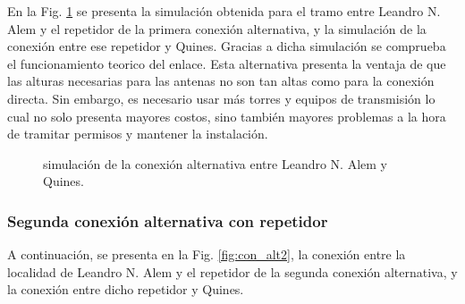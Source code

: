 \documentclass[11pt,a4paper]{article}
\begin{document}
En la Fig. \ref{fig:sim_alt} se presenta la simulación obtenida para el tramo entre Leandro N. Alem y el repetidor de la primera conexión alternativa, y la simulación de la conexión entre ese repetidor y Quines.
Gracias a dicha simulación se comprueba el funcionamiento teorico del enlace.
Esta alternativa presenta la ventaja de que las alturas necesarias para las antenas no son tan altas como para la conexión directa.
Sin embargo, es necesario usar más torres y equipos de transmisión lo cual no solo presenta mayores costos, sino también mayores problemas a la hora de tramitar permisos y mantener la instalación.

\begin{figure}[ht!]
  \centering
  \quad
  \quad
  \caption{simulación de la conexión alternativa entre Leandro N. Alem y Quines.}
  \label{fig:sim_alt}
\end{figure}

\clearpage

\subsubsection{Segunda conexión alternativa con repetidor}

A continuación, se presenta en la Fig. \ref{fig:con_alt2}, la conexión entre la localidad de Leandro N. Alem y el repetidor de la segunda conexión alternativa, y la conexión entre dicho repetidor y Quines.
\end{document}

